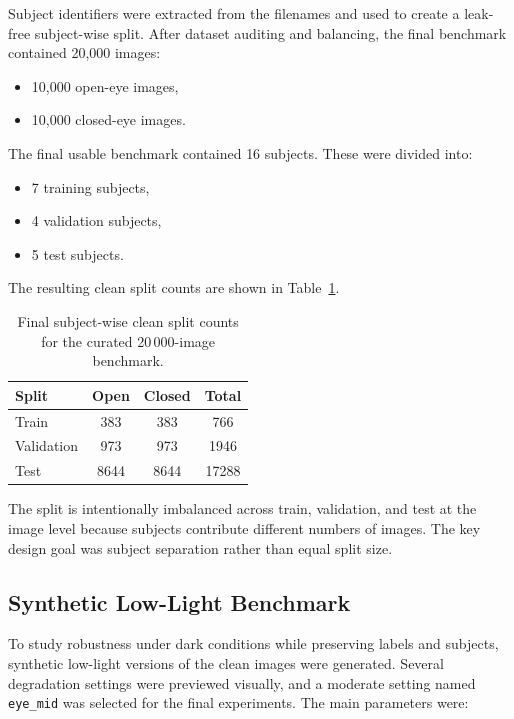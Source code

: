 \documentclass[conference]{IEEEtran}
\begin{document}
Subject identifiers were extracted from the filenames and used to create a leak-free subject-wise split. After dataset auditing and balancing, the final benchmark contained 20,000 images:

\begin{itemize}
\item 10,000 open-eye images,
\item 10,000 closed-eye images.
\end{itemize}

The final usable benchmark contained 16 subjects. These were divided into:

\begin{itemize}
\item 7 training subjects,
\item 4 validation subjects,
\item 5 test subjects.
\end{itemize}

The resulting clean split counts are shown in Table~\ref{tab:split_counts}.

\begin{table}[!t]
\caption{Final subject-wise clean split counts for the curated 20\,000-image benchmark.}
\label{tab:split_counts}
\centering
\footnotesize
\setlength{\tabcolsep}{7pt}
\begin{tabular}{lccc}
\toprule
Split & Open & Closed & Total \\
\midrule
Train & 383 & 383 & 766 \\
Validation & 973 & 973 & 1946 \\
Test & 8644 & 8644 & 17288 \\
\bottomrule
\end{tabular}
\end{table}

The split is intentionally imbalanced across train, validation, and test at the image level because subjects contribute different numbers of images. The key design goal was subject separation rather than equal split size.

\subsection{Synthetic Low-Light Benchmark}

To study robustness under dark conditions while preserving labels and subjects, synthetic low-light versions of the clean images were generated. Several degradation settings were previewed visually, and a moderate setting named \texttt{eye\_mid} was selected for the final experiments. The main parameters were:
\end{document}
